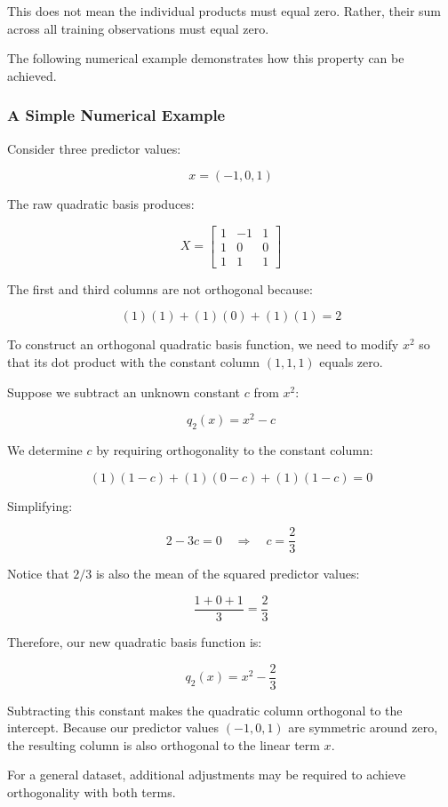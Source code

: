 \documentclass[
  letterpaper,
  DIV=11,
  numbers=noendperiod]{scrreprt}
\begin{document}
This does not mean the individual products must equal zero. Rather,
their sum across all training observations must equal zero.

The following numerical example demonstrates how this property can be
achieved.

\subsubsection{A Simple Numerical
Example}\label{a-simple-numerical-example}

Consider three predictor values:

\[
x=(-1,0,1)
\]

The raw quadratic basis produces:

\[
X=
\begin{bmatrix}
1&-1&1\\
1&0&0\\
1&1&1
\end{bmatrix}
\]

The first and third columns are not orthogonal because:

\[
(1)(1)+(1)(0)+(1)(1)=2
\]

To construct an orthogonal quadratic basis function, we need to modify
\(x^2\) so that its dot product with the constant column \((1,1,1)\)
equals zero.

Suppose we subtract an unknown constant \(c\) from \(x^2\):

\[
q_2(x)=x^2-c
\]

We determine \(c\) by requiring orthogonality to the constant column:

\[
(1)(1-c)+(1)(0-c)+(1)(1-c)=0
\]

Simplifying:

\[
2-3c=0
\quad\Rightarrow\quad
c=\frac{2}{3}
\]

Notice that \(2/3\) is also the mean of the squared predictor values:

\[
\frac{1+0+1}{3}=\frac{2}{3}
\]

Therefore, our new quadratic basis function is:

\[
q_2(x)=x^2-\frac{2}{3}
\]

Subtracting this constant makes the quadratic column orthogonal to the
intercept. Because our predictor values \((-1,0,1)\) are symmetric
around zero, the resulting column is also orthogonal to the linear term
\(x\).

For a general dataset, additional adjustments may be required to achieve
orthogonality with both terms.
\end{document}
